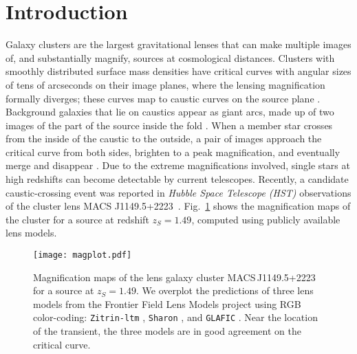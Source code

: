 \documentclass{aastex6}
\newcommand{\reffig}[1]{Fig.~\ref{fig:#1}}
\begin{document}

\section{Introduction}
\label{sec:intro}

Galaxy clusters are the largest gravitational lenses that can make multiple 
images of, and substantially magnify, sources at cosmological distances. Clusters 
with smoothly distributed surface mass densities have critical curves with angular sizes 
of tens of arcseconds on their image planes, where the lensing magnification formally 
diverges; these curves map to caustic curves on the source plane \citep{1986ApJ...310..568B}. 
Background galaxies that lie on caustics appear as giant arcs, 
made up of two images of the part of the source inside the fold \citep[see e.g.][]{Dalal:2003kw}.
When a member star crosses from the inside of the caustic to the outside, a pair of
images approach the critical curve from both sides, brighten to a peak magnification, and 
eventually merge and disappear \citep{1991ApJ...379...94M}. Due to the extreme 
magnifications involved, single stars at high redshifts can become detectable by current 
telescopes. Recently, a candidate caustic-crossing event was reported 
in {\em Hubble Space Telescope (HST)} observations of the cluster lens MACS J1149.5+2223~\citep{2016ATel.9097....1K}. 
\reffig{magplot} shows the magnification maps of the cluster for a source at redshift $z_S = 1.49$, 
computed using publicly available lens models.

\begin{figure}[t]
  \begin{center}
    \texttt{[image: magplot.pdf]}
    \caption{\label{fig:magplot} Magnification maps of the lens galaxy cluster MACS\,J1149.5+2223 for a source at $z_S=1.49$. We overplot the predictions of three lens models from the Frontier Field Lens Models project using RGB color-coding: {\tt Zitrin-ltm} \citep[red;][]{2009ApJ...703L.132Z}, {\tt Sharon} \citep[green;][]{2014ApJ...797...48J}, and {\tt GLAFIC} \citep[blue;][]{Kawamata:2015haa,2010PASJ...62.1017O}. Near the location of the transient, the three models are in good agreement on the critical curve.}
  \end{center}
\end{figure}
\end{document}
